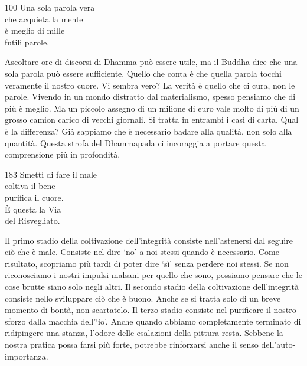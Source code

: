 
\begin{dhpVerse}{100}
\label{dhp-100}
Una sola parola vera\\
che acquieta la mente\\
è meglio di mille\\
futili parole.
\end{dhpVerse}

\begin{dhpRefl}
  Ascoltare ore di discorsi di Dhamma può essere utile, ma il Buddha dice che
  una sola parola può essere sufficiente. Quello che conta è che quella parola
  tocchi veramente il nostro cuore. Vi sembra vero? La verità è quello che ci
  cura, non le parole. Vivendo in un mondo distratto dal materialismo, spesso
  pensiamo che di più è meglio. Ma un piccolo assegno di un milione di euro vale
  molto di più di un grosso camion carico di vecchi giornali. Si tratta in
  entrambi i casi di carta. Qual è la differenza? Già sappiamo che è necessario
  badare alla qualità, non solo alla quantità. Questa strofa del Dhammapada ci
  incoraggia a portare questa comprensione più in profondità.
\end{dhpRefl}


\begin{dhpVerse}{183}
\label{dhp-183}
Smetti di fare il male\\
coltiva il bene\\
purifica il cuore.\\
È questa la Via\\
del Risvegliato.
\end{dhpVerse}

\begin{dhpRefl}
  Il primo stadio della coltivazione dell'integrità consiste nell'astenersi dal
  seguire ciò che è male. Consiste nel dire `no' a noi stessi quando è
  necessario. Come risultato, scopriamo più tardi di poter dire `sì' senza
  perdere noi stessi. Se non riconosciamo i nostri impulsi malsani per quello
  che sono, possiamo pensare che le cose brutte siano solo negli altri. Il
  secondo stadio della coltivazione dell'integrità consiste nello sviluppare ciò
  che è buono. Anche se si tratta solo di un breve momento di bontà, non
  scartatelo. Il terzo stadio consiste nel purificare il nostro sforzo dalla
  macchia dell'`io'. Anche quando abbiamo completamente terminato di ridipingere
  una stanza, l'odore delle esalazioni della pittura resta. Sebbene la nostra
  pratica possa farsi più forte, potrebbe rinforzarsi anche il senso
  dell'auto-importanza.
\end{dhpRefl}

